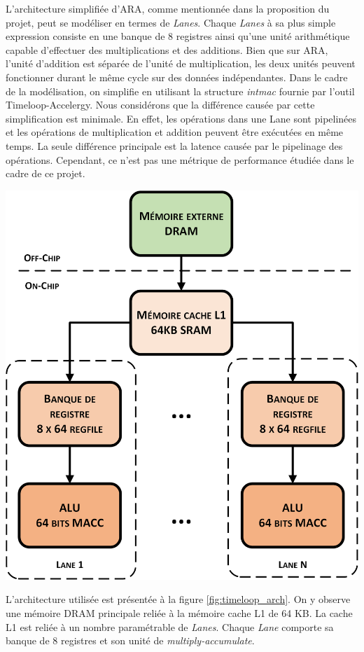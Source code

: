 \documentclass[11pt,letterpaper]{article}
\begin{document}
\begin{multicols}{2}
    L'architecture simplifiée d'ARA, comme mentionnée dans la proposition du projet, peut se modéliser en termes de 
    \textit{Lanes}. Chaque \textit{Lanes} à sa plus simple expression consiste en une banque de 8 registres ainsi qu'une
    unité arithmétique capable d'effectuer des multiplications et des additions. Bien que sur ARA, l'unité d'addition 
    est séparée de l'unité de multiplication, les deux unités peuvent fonctionner durant le même cycle sur des données
    indépendantes. Dans le cadre de la modélisation, on simplifie en utilisant la structure \textit{intmac} fournie par
    l'outil Timeloop-Accelergy. Nous considérons que la différence causée par cette simplification est minimale. En effet,
    les opérations dans une Lane sont pipelinées et les opérations de multiplication et addition peuvent être exécutées en même temps.
    La seule différence principale est la latence causée par le pipelinage des opérations. Cependant, ce n'est pas une métrique
    de performance étudiée dans le cadre de ce projet.

    {\centering
    \includegraphics[width=0.8\linewidth]{arch_visio.png}
    \captionsetup{hypcap=false}
    \label{fig:timeloop_arch}}
    \bigskip

    L'architecture utilisée est présentée à la figure \ref{fig:timeloop_arch}. On y observe une mémoire DRAM principale reliée à 
    la mémoire cache L1 de 64 KB. La cache L1 est reliée à un nombre paramétrable de \textit{Lanes}. 
    Chaque \textit{Lane} comporte sa banque de 8 registres et son unité de \textit{multiply-accumulate}.


\end{multicols}
\end{document}
